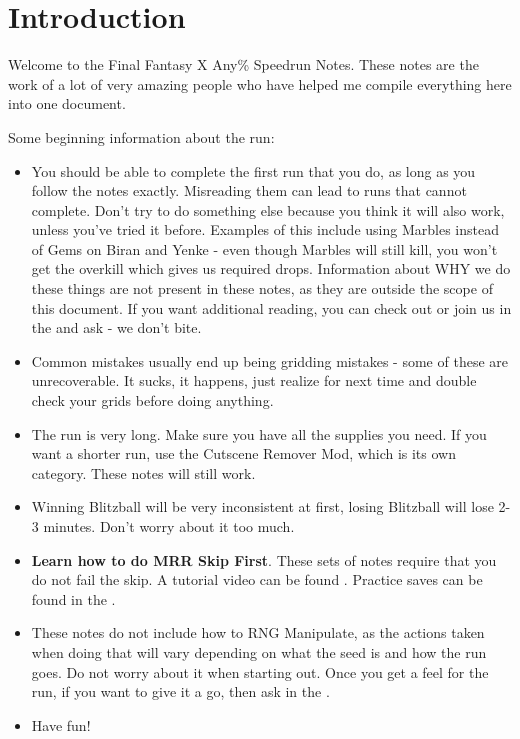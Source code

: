 \chapter{Introduction}

Welcome to the Final Fantasy X Any\% Speedrun Notes. These notes are the work of a lot of very amazing people who have helped me compile everything here into one document.

Some beginning information about the run:

\begin{itemize}
    \item You should be able to complete the first run that you do, as long as you follow the notes exactly. Misreading them can lead to runs that cannot complete. Don't try to do something else because you think it will also work, unless you've tried it before. Examples of this include using Marbles instead of Gems on Biran and Yenke - even though Marbles will still kill, you won't get the overkill which gives us required drops. Information about WHY we do these things are not present in these notes, as they are outside the scope of this document. If you want additional reading, you can check out  or join us in the  and ask - we don't bite.
    \item Common mistakes usually end up being gridding mistakes - some of these are unrecoverable. It sucks, it happens, just realize for next time and double check your grids before doing anything.
    \item The run is very long. Make sure you have all the supplies you need. If you want a shorter run, use the Cutscene Remover Mod, which is its own category. These notes will still work.
    \item Winning Blitzball will be very inconsistent at first, losing Blitzball will lose 2-3 minutes. Don't worry about it too much.
    \item \textbf{Learn how to do MRR Skip First}. These sets of notes require that you do not fail the skip. A tutorial video can be found . Practice saves can be found in the .
    \item These notes do not include how to RNG Manipulate, as the actions taken when doing that will vary depending on what the seed is and how the run goes. Do not worry about it when starting out. Once you get a feel for the run, if you want to give it a go, then ask in the .
    \item Have fun!
\end{itemize}


